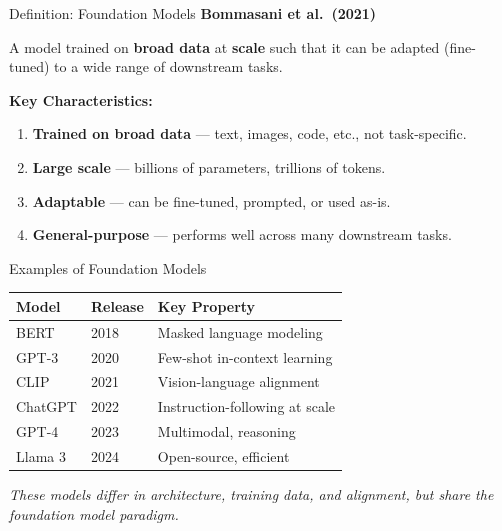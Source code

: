 \documentclass[aspectratio=169,10pt]{beamer}
\begin{document}
\begin{frame}{Definition: Foundation Models}
  \textbf{Bommasani et al.\ (2021)}

  \vspace{0.3cm}

  \begin{tcolorbox}[hitbox, title=Foundation Model]
    A model trained on \textbf{broad data} at \textbf{scale} such that it can be adapted
    (fine-tuned) to a wide range of downstream tasks.
  \end{tcolorbox}

  \vspace{0.4cm}

  \textbf{Key Characteristics:}

  \begin{enumerate}
    \item \textbf{Trained on broad data} — text, images, code, etc., not task-specific.
    \item \textbf{Large scale} — billions of parameters, trillions of tokens.
    \item \textbf{Adaptable} — can be fine-tuned, prompted, or used as-is.
    \item \textbf{General-purpose} — performs well across many downstream tasks.
  \end{enumerate}
\end{frame}

\begin{frame}{Examples of Foundation Models}
  \begin{center}
    \begin{tabular}{lll}
      \toprule
      \textbf{Model} & \textbf{Release} & \textbf{Key Property} \\
      \midrule
      BERT & 2018 & Masked language modeling \\
      GPT-3 & 2020 & Few-shot in-context learning \\
      CLIP & 2021 & Vision-language alignment \\
      ChatGPT & 2022 & Instruction-following at scale \\
      GPT-4 & 2023 & Multimodal, reasoning \\
      Llama 3 & 2024 & Open-source, efficient \\
      \bottomrule
    \end{tabular}
  \end{center}

  \vspace{0.3cm}

  \textit{These models differ in architecture, training data, and alignment, but share the foundation model paradigm.}
\end{frame}
\end{document}
